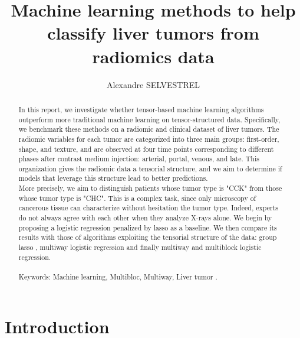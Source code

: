 \documentclass[10pt]{article}
\title{Machine learning methods to help classify liver tumors from radiomics data}
\author[1]{Alexandre SELVESTREL}
\affil[1]{Laboratoire des syst\`emes, Orsay France}
\affil[2]{Centrale-Sup\'elec, Gif-sur-Yvette France}
\begin{document}
    \date{}
    \maketitle

\begin{abstract}
\noindent In this report, we investigate whether tensor-based machine learning algorithms outperform more traditional machine learning on tensor-structured data. Specifically, we benchmark these methods on a radiomic and clinical dataset of liver tumors. The radiomic variables for each tumor are categorized into three main groups: first-order, shape, and texture, and are observed at four time points corresponding to different phases after contrast medium injection: arterial, portal, venous, and late. This organization gives the radiomic data a tensorial structure, and we aim to determine if models that leverage this structure lead to better predictions.\\
\indent More precisely, we aim to distinguish patients whose tumor type is "CCK" from those whose tumor type is "CHC".  This is a complex task, since only microscopy of cancerous tissue can characterize without hesitation the tumor type. Indeed, experts do not always agree with each other when they analyze X-rays alone. We begin by proposing a logistic regression penalized by lasso as a baseline. We then compare its results with those of algorithms exploiting the tensorial structure of the data: group lasso \cite{grp_lasso}, multiway logistic regression \cite{multi_rank_1,multi_rank_r} and finally multiway and multiblock logistic regression.
\\\\Keywords: Machine learning, Multibloc, Multiway, Liver tumor .  
\end{abstract}


\section{Introduction}
\end{document}
